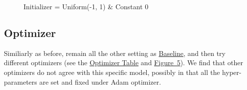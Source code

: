\documentclass{article}
\begin{document}
\begin{figure}
	\centering
	\caption{Initializer = Uniform(-1, 1) \& Constant 0}
	\label{fig-4}
\end{figure}


\subsection{Optimizer}
Similiarly as before, remain all the other setting as \hyperref[base]{Baseline}, and then try different optimizers (see the \hyperref[tab-4]{Optimizer Table} and \hyperref[fig-5]{Figure~5}). We find that other optimizers do not agree with this specific model, possibly in that all the hyper-parameters are set and fixed under Adam optimizer.
\end{document}
